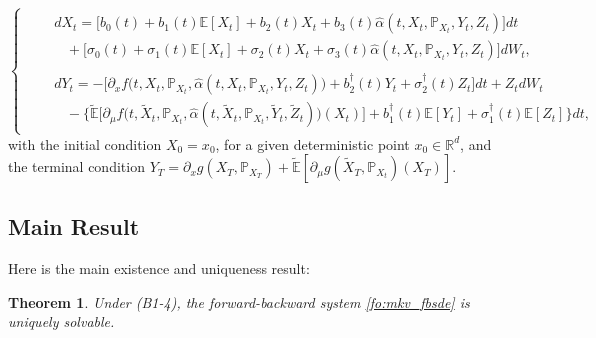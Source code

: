 \documentclass[11pt]{amsart}
\newtheorem{theorem}{Theorem}[section]
\begin{document}
\begin{equation}
\label{fo:mkv_fbsde}
\begin{cases}
&\begin{split}
&dX_{t} = \bigl[b_0(t)+b_1(t){\mathbb E}[X_t]+b_2(t)X_t+b_3(t)\hat\alpha(t,X_t,{\mathbb P}_{X_t},Y_t,Z_{t}) \bigr] dt 
\\
&\hspace{10pt}+ \bigl[ \sigma_{0}(t) + \sigma_{1}(t) {\mathbb E}[X_{t}] + \sigma_{2}(t) X_{t} + \sigma_{3}(t)
\hat{\alpha}(t,X_{t},{\mathbb P}_{X_{t}},Y_{t},Z_{t}) \bigr] dW_{t},
\end{split}
\\
&\begin{split}
&dY_{t} = - \bigl[ \partial_{x} f\bigl(t,X_{t},{\mathbb P}_{X_t},\hat{\alpha}(t,X_{t},{\mathbb P}_{X_{t}},Y_{t},Z_{t}) \bigr)  
+b_{2}^{\dagger}(t) Y_{t} 
+\sigma_{2}^{\dagger}(t) Z_{t} \bigr] dt
+ Z_{t}dW_{t}
\\
&\hspace{10pt} - \bigl\{ \tilde{\mathbb E} \bigl[\partial_{\mu} f\bigl(t,\tilde{X}_{t},{\mathbb P}_{X_{t}},\hat{\alpha}(t,\tilde{X}_{t},{\mathbb P}_{X_{t}},
\tilde{Y}_{t},\tilde{Z}_{t}) \bigr)(X_{t}) \bigr] + b_{1}^{\dagger}(t) {\mathbb E} [ Y_{t} ] +\sigma_{1}^{\dagger}(t) {\mathbb E} [ Z_{t} ] 
\bigr\} dt,
\end{split}
\end{cases}
\end{equation}
 with the initial condition $X_{0}=x_{0}$, for a given deterministic point $x_{0} \in {\mathbb R}^d$, and the terminal condition $Y_{T} = \partial_{x} g(X_{T},{\mathbb P}_{X_{T}}) + \tilde{\mathbb E}[\partial_{\mu} g(\tilde{X}_{T},{\mathbb P}_{X_t})(X_{T})]$. 

\subsection{Main Result} 
Here is the main existence and uniqueness result:
\begin{theorem}
\label{th:sol:mkv}
Under (B1-4), the forward-backward system \eqref{fo:mkv_fbsde} is uniquely solvable. 
\end{theorem}
\end{document}
